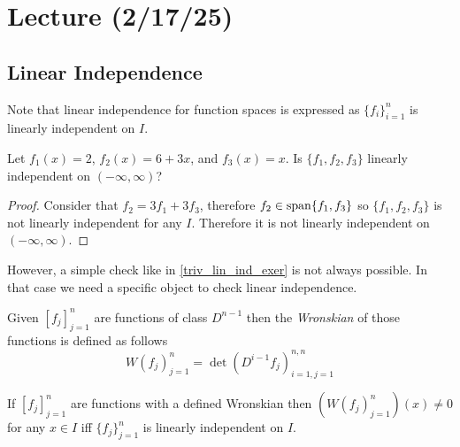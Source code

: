 \documentclass[notes]{subfiles}
\begin{document}
\setcounter{section}{8}
\section{Lecture (2/17/25)}
\subsection{Linear Independence}
Note that linear independence for function spaces is expressed as $\{ f_i \}_{i = 1}^n$ is linearly independent on $I$.

\begin{exercise} \label{triv_lin_ind_exer}
    Let $f_1(x) = 2$, $f_2(x) = 6 + 3x$, and $f_3(x) = x$. Is $\{ f_1, f_2, f_3 \}$ linearly independent on $(-\infty, \infty)$?
\end{exercise}
\begin{proof}
    Consider that $f_2 = 3f_1 + 3f_3$, therefore $f_2 \in \operatorname{span}\{ f_1, f_3 \}$ so $\{ f_1, f_2, f_3 \}$ is not linearly independent for any $I$. Therefore it is not linearly independent on $(-\infty, \infty)$.
\end{proof}

However, a simple check like in \cref{triv_lin_ind_exer} is not always possible. In that case we need a specific object to check linear independence.

\begin{definition}[Wronskian]
    Given $[f_j]_{j = 1}^n$ are functions of class $D^{n - 1}$ then the \textit{Wronskian} of those functions is defined as follows
    \[
        W(f_j)_{j = 1}^n = \det(D^{i - 1}f_j)_{i = 1, j = 1}^{n, n}
    \]
\end{definition}

\begin{theorem} \label{wronskian_theorem}
    If $[f_j]_{j = 1}^n$ are functions with a defined Wronskian then $(W(f_j)_{j = 1}^n)(x) \neq 0$ for any $x \in I$ iff $\{ f_j \}_{j = 1}^n$ is linearly independent on $I$.
\end{theorem}
\end{document}
